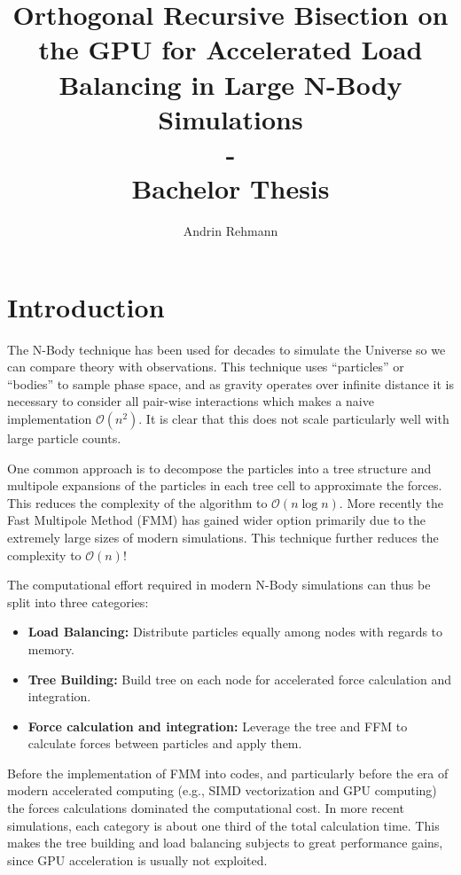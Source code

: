 \documentclass[]{article}
\title{Orthogonal Recursive Bisection on the GPU for Accelerated Load Balancing in Large N-Body Simulations \\ - \\ Bachelor Thesis}
\author{Andrin Rehmann}
\begin{document}
\maketitle

\newpage

\tableofcontents

\newpage
\section{Introduction}


The N-Body technique has been used for decades to simulate the Universe so we can compare theory with observations. This technique uses ``particles'' or ``bodies'' to sample phase space, and as gravity operates over infinite distance it is necessary to consider all pair-wise interactions which makes a naive implementation $\mathcal{O}(n^2)$.
It is clear that this does not scale particularly well with large particle counts.

One common approach is to decompose the particles into a tree structure and multipole expansions of the particles in each tree cell to approximate the forces. This reduces the complexity of the algorithm to $\mathcal{O}(n\log{}n)$. More recently the Fast Multipole Method (FMM) has gained wider option primarily due to the extremely large sizes of modern simulations. This technique further reduces the complexity to $\mathcal{O}(n)$!

The computational effort required in modern N-Body simulations can thus be split into three categories:

\begin{itemize}
	\item \textbf{Load Balancing:} Distribute particles equally among nodes with regards to memory.
	\item \textbf{Tree Building:} Build tree on each node for accelerated force calculation and integration.
	\item \textbf{Force calculation and integration:} Leverage the tree and FFM to calculate forces between particles and apply them.
\end{itemize}

Before the implementation of FMM into codes, and particularly before the era of modern accelerated computing (e.g., SIMD vectorization and GPU computing) the forces calculations dominated the computational cost. In more recent simulations, each category is about one third of the total calculation time\cite{2017ComAC...4....2P}. This makes the tree building and load balancing subjects to great performance gains, since GPU acceleration is usually not exploited. 
\end{document}
